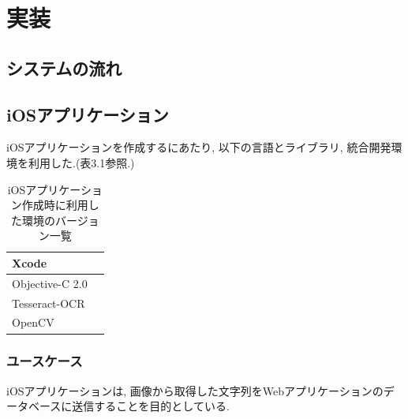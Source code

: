 \chapter{実装}
\label{chap:poordirection}

\section{システムの流れ}

\section{iOSアプリケーション}
iOSアプリケーションを作成するにあたり, 以下の言語とライブラリ, 統合開発環境を利用した.(表3.1参照.)

\begin{table}
\begin{center}
\begin{tabular}{|l|l|} \hline
Xcode &  \\ \hline
Objective-C 2.0 & \\ \hline
Tesseract-OCR & \\ \hline
OpenCV & \\ \hline
\end{tabular}
\end{center}
\caption{iOSアプリケーション作成時に利用した環境のバージョン一覧}
\end{table}

\subsection{ユースケース}
iOSアプリケーションは, 画像から取得した文字列をWebアプリケーションのデータベースに送信することを目的としている.

